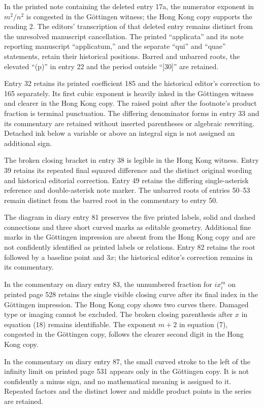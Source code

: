 In the printed note containing the deleted entry 17a, the numerator exponent in \(m^2/n^2\) is congested in the Göttingen witness; the Hong Kong copy supports the reading 2. The editors’ transcription of that deleted entry remains distinct from the unresolved manuscript cancellation. The printed “applicata” and its note reporting manuscript “applicatum,” and the separate “qui” and “quae” statements, retain their historical positions. Barred and unbarred roots, the elevated “(p)” in entry 22 and the period outside “[30]” are retained.

Entry 32 retains its printed coefficient 185 and the historical editor’s correction to 165 separately. Its first cubic exponent is heavily inked in the Göttingen witness and clearer in the Hong Kong copy. The raised point after the footnote’s product fraction is terminal punctuation. The differing denominator forms in entry 33 and its commentary are retained without inserted parentheses or algebraic rewriting. Detached ink below a variable or above an integral sign is not assigned an additional sign.

The broken closing bracket in entry 38 is legible in the Hong Kong witness. Entry 39 retains its repeated final squared difference and the distinct original wording and historical editorial correction. Entry 49 retains the differing single-asterisk reference and double-asterisk note marker. The unbarred roots of entries 50–53 remain distinct from the barred root in the commentary to entry 50.

The diagram in diary entry 81 preserves the five printed labels, solid and dashed connections and three short curved marks as editable geometry. Additional fine marks in the Göttingen impression are absent from the Hong Kong copy and are not confidently identified as printed labels or relations. Entry 82 retains the root followed by a baseline point and \(3x\); the historical editor’s correction remains in its commentary.

In the commentary on diary entry 83, the unnumbered fraction for \(ix_i^m\) on printed page 528 retains the single visible closing curve after its final index in the Göttingen impression. The Hong Kong copy shows two curves there. Damaged type or imaging cannot be excluded. The broken closing parenthesis after \(x\) in equation (18) remains identifiable. The exponent \(m+2\) in equation (7), congested in the Göttingen copy, follows the clearer second digit in the Hong Kong copy.

In the commentary on diary entry 87, the small curved stroke to the left of the infinity limit on printed page 531 appears only in the Göttingen copy. It is not confidently a minus sign, and no mathematical meaning is assigned to it. Repeated factors and the distinct lower and middle product points in the series are retained.

